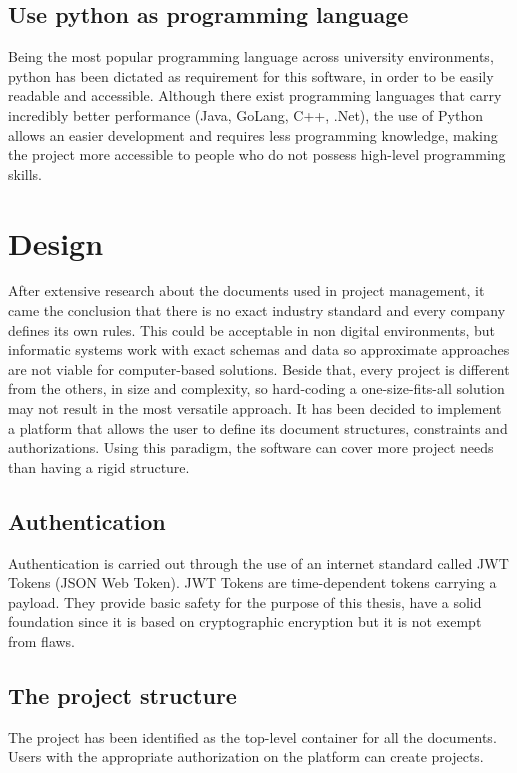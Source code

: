 \documentclass[12pt]{report}
\begin{document}
\subsection{Use python as programming language}
Being the most popular programming language across university environments, python has been dictated as requirement for this software, in order to be easily readable and accessible.
Although there exist programming languages that carry incredibly better performance (Java, GoLang, C++, .Net), the use of Python allows an easier development and requires less programming knowledge, making the project more accessible to people who do not possess high-level programming skills.

\section{Design}

After extensive research about the documents used in project management, it came the conclusion that there is no exact industry standard and every company defines its own rules. This could be acceptable in non digital environments, but informatic systems work with exact schemas and data so approximate approaches are not viable for computer-based solutions.
Beside that, every project is different from the others, in size and complexity, so hard-coding a one-size-fits-all solution may not result in the most versatile approach.
It has been decided to implement a platform that allows the user to define its document structures, constraints and authorizations. Using this paradigm, the software can cover more project needs than having a rigid structure.

\subsection{Authentication}
Authentication is carried out through the use of an internet standard called JWT Tokens (JSON Web Token). JWT Tokens are time-dependent tokens carrying a payload. They provide basic safety for the purpose of this thesis, have a solid foundation since it is based on cryptographic encryption but it is not exempt from flaws.

\subsection{The project structure}
The project has been identified as the top-level container for all the documents. Users with the appropriate authorization on the platform can create projects.
\end{document}

